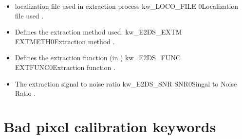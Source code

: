 \begin{itemize}

\item {}
{localization file used in extraction process}
{kw\_LOCO\_FILE}
{}{0}{Localization file used}
{\calextractRAW}{\spirouKeywords}{\calextractRAW.\progMAIN}

\item {}
{Defines the extraction method used.}
{kw\_E2DS\_EXTM}
{EXTMETH}{0}{Extraction method}
{\calextractRAW}{\spirouKeywords}{\calextractRAW.\progMAIN}

\item {}
{Defines the extraction function (in \spirouEXTOR)}
{kw\_E2DS\_FUNC}
{EXTFUNC}{0}{Extraction function}
{\calextractRAW}{\spirouKeywords}{\calextractRAW.\progMAIN}

\item {}
{The extraction signal to noise ratio}
{kw\_E2DS\_SNR}
{SNR}{0}{Singal to Noise Ratio}
{\calextractRAW}{\spirouKeywords}{\calextractRAW.\progMAIN}

\end{itemize}





\section{Bad pixel calibration keywords}
\label{ch:output_keywords:badpix}

